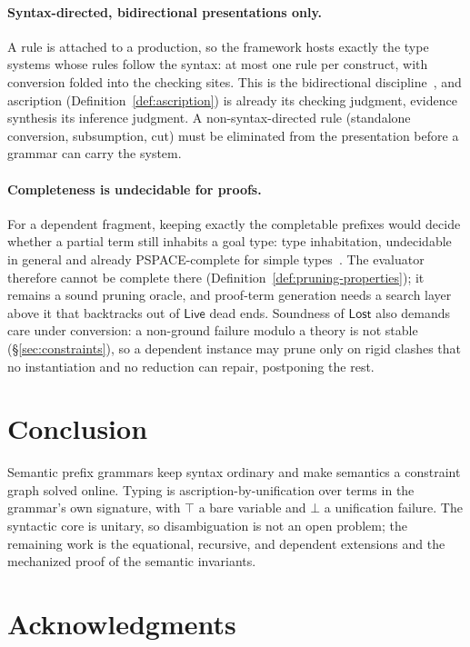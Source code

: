 \documentclass[11pt]{article}
\begin{document}
\paragraph{Syntax-directed, bidirectional presentations only.}
A rule is attached to a production, so the framework hosts exactly the type
systems whose rules follow the syntax: at most one rule per construct, with
conversion folded into the checking sites. This is the bidirectional
discipline~\cite{dunfield2021bidirectional}, and ascription
(Definition~\ref{def:ascription}) is already its checking judgment, evidence
synthesis its inference judgment. A non-syntax-directed rule (standalone
conversion, subsumption, cut) must be eliminated from the presentation before
a grammar can carry the system.

\paragraph{Completeness is undecidable for proofs.}
For a dependent fragment, keeping exactly the completable prefixes would decide
whether a partial term still inhabits a goal type: type inhabitation,
undecidable in general and already PSPACE-complete for simple
types~\cite{statman1979intuitionistic}. The evaluator therefore cannot be
complete there (Definition~\ref{def:pruning-properties}); it remains a sound
pruning oracle, and proof-term generation needs a search layer above it that
backtracks out of $\mathsf{Live}$ dead ends. Soundness of $\mathsf{Lost}$ also
demands care under conversion: a non-ground failure modulo a theory is not
stable (\S\ref{sec:constraints}), so a dependent instance may prune only on
rigid clashes that no instantiation and no reduction can repair, postponing
the rest.

\section{Conclusion}
\label{sec:conclusion}

Semantic prefix grammars keep syntax ordinary and make semantics a constraint
graph solved online. Typing is ascription-by-unification over terms in the
grammar's own signature, with $\top$ a bare variable and $\bot$ a unification
failure. The syntactic core is unitary, so disambiguation is not an open
problem; the remaining work is the equational, recursive, and dependent
extensions and the mechanized proof of the semantic invariants.

\section*{Acknowledgments}
\end{document}
